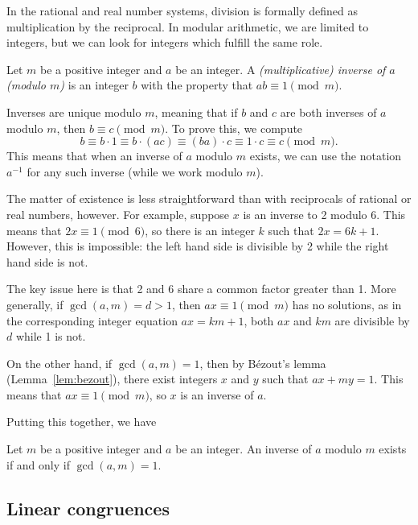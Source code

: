 In the rational and real number systems, division is formally defined as multiplication by the reciprocal. In modular arithmetic, we are limited to integers, but we can look for integers which fulfill the same role.

\begin{definition}
Let $m$ be a positive integer and $a$ be an integer. A \emph{(multiplicative) inverse of $a$ (modulo $m$)} is an integer $b$ with the property that $ab\equiv 1\pmod{m}$.
\end{definition}

Inverses are unique modulo $m$, meaning that if $b$ and $c$ are both inverses of $a$ modulo $m$, then $b\equiv c\pmod{m}$. To prove this, we compute
\begin{equation*}
b\equiv b\cdot 1\equiv b\cdot (ac)\equiv (ba)\cdot c\equiv 1\cdot c\equiv c\pmod{m}.
\end{equation*}
This means that when an inverse of $a$ modulo $m$ exists, we can use the notation $a^{-1}$ for any such inverse (while we work modulo $m$).

The matter of existence is less straightforward than with reciprocals of rational or real numbers, however. For example, suppose $x$ is an inverse to 2 modulo 6. This means that $2x\equiv 1\pmod{6}$, so there is an integer $k$ such that $2x = 6k + 1$. However, this is impossible: the left hand side is divisible by 2 while the right hand side is not.

The key issue here is that 2 and 6 share a common factor greater than 1. More generally, if $\gcd(a,m) = d > 1$, then $ax\equiv 1\pmod{m}$ has no solutions, as in the corresponding integer equation $ax = km + 1$, both $ax$ and $km$ are divisible by $d$ while 1 is not.

On the other hand, if $\gcd(a,m) = 1$, then by B\'{e}zout's lemma (Lemma~\ref{lem:bezout}), there exist integers $x$ and $y$ such that $ax + my = 1$. This means that $ax\equiv 1\pmod{m}$, so $x$ is an inverse of $a$.

Putting this together, we have
\begin{theorem}\label{thm:existence-of-inverses}
Let $m$ be a positive integer and $a$ be an integer. An inverse of $a$ modulo $m$ exists if and only if $\gcd(a,m) = 1$.
\end{theorem}


\subsection{Linear congruences}

